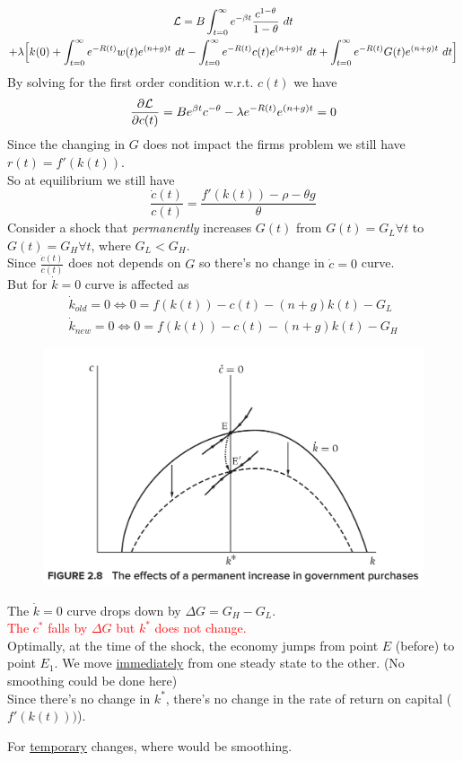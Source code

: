 \documentclass[]{article}
\begin{document}
			\begin{gather*}
				\mathcal{{L}} = B \int_{t=0}^\infty e^{-\beta t} \frac{c^{1-\theta}}{1-\theta}\ dt \\
				+ \lambda \Big[ k(0) + \int_{t=0}^\infty e^{-R(t)} w(t) e^{(n+g)t} \ dt - \int_{t=0}^\infty e^{-R(t)} c(t) e^{(n+g)t}\ dt + \int_{t=0}^\infty e^{-R(t)} G(t) e^{(n+g)t}\ dt\Big]
			\end{gather*}
			By solving for the first order condition w.r.t. $c(t)$ we have 
			\[
				\frac{\partial{\mathcal{{L}}}}{\partial{c(t)}} = B e^{\beta t} c^{-\theta} - \lambda e^{-R(t)} e^{(n+g)t} = 0
			\]
			Since the changing in $G$ does not impact the firms problem we still have $r(t) = f'(k(t))$. \\
			So at equilibrium we still have 
			\[
				\frac{\dot{c}(t)}{c(t)} = \frac{f'(k(t)) - \rho - \theta g}{\theta}
			\]
			Consider a shock that \emph{permanently} increases $G(t)$ from $G(t) = G_L \forall t$ to $G(t) = G_H \forall t$, where $G_L < G_H$. \\
			Since $\frac{\dot{c}(t)}{c(t)}$ does not depends on $G$ so there's no change in $\dot{c}=0$ curve. \\
			But for $\dot{k}=0$ curve is affected as
			\begin{gather*}
				\dot{k}_{old} = 0 \iff 0 = f(k(t)) - c(t) - (n+g)k(t) - G_L \\ 
				\dot{k}_{new} = 0 \iff 0 = f(k(t)) - c(t) - (n+g)k(t) - G_H
			\end{gather*}
			\begin{figure}[h]
				\centering
				\includegraphics[width=0.8\linewidth]{figures/7_2}
			\end{figure}
			The $\dot{k}=0$ curve drops down by $\Delta G = G_H - G_L$. \\
			\textcolor{red}{The $c^*$ falls by $\Delta G$ but $k^*$ does not change.} \\
			Optimally, at the time of the shock, the economy jumps from point $E$ (before) to point $E_1$. We move \ul{immediately} from one steady state to the other. (No smoothing could be done here) \\
			Since there's no change in $k^*$, there's no change in the rate of return on capital ($f'(k(t)))$).
			\begin{remark}
				For \ul{temporary} changes, where would be smoothing.
			\end{remark}
\end{document}
